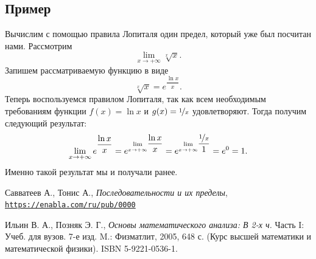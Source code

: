 \documentclass[12pt]{article}
\begin{document}
\subsection{Пример}
Вычислим с помощью правила Лопиталя один предел, который уже был посчитан нами. Рассмотрим
\begin{equation}
    \lim_{x\rightarrow +\infty}{\sqrt[x]{x}}.
\end{equation}
Запишем рассматриваемую функцию в виде
\begin{equation}
    \sqrt[x]{x} = e^{\dfrac{\ln{x}}{x}}.
\end{equation}
Теперь воспользуемся правилом Лопиталя, так как всем необходимым требованиям функции $f(x) = \ln{x}$ и $g(x) = \nicefrac{1}{x}$ удовлетворяют. Тогда получим следующий результат:
\begin{equation}
    \lim_{x\rightarrow +\infty}{e^{\dfrac{\ln{x}}{x}}} = e^{\underset{x\rightarrow +\infty}{\lim}\dfrac{\ln{x}}{x}} = e^{\underset{x\rightarrow +\infty}{\lim}\dfrac{\nicefrac{1}{x}}{1}}= e^0 = 1.
\end{equation}
Именно такой результат мы и получали ранее.


\medskip 
\begin{thebibliography}{9}

Савватеев А., Тонис А., \textit{Последовательности и их пределы},
\\\texttt{\url{https://enabla.com/ru/pub/0000}}

Ильин В. А., Позняк Э. Г., \textit{Основы математического анализа: В 2\--х ч.} Часть I: Учеб. для вузов. 7-е изд. M.: Физматлит, 2005, 648 с. (Курс высшей математики и математической физики). ISBN
5-9221-0536-1.

\end{thebibliography}
\end{document}
